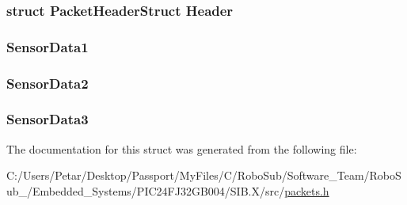\subsubsection[{Header}]{\setlength{\rightskip}{0pt plus 5cm}struct {\bf Packet\+Header\+Struct} Header}\label{struct_packet_sensor_data_get_struct_ab201af50281aff5ed4f984f994938007}
\hypertarget{struct_packet_sensor_data_get_struct_a0a8ee9f45b646be8f50ba0823043e9e2}{}
\subsubsection[{Sensor\+Data1}]{ Sensor\+Data1}\label{struct_packet_sensor_data_get_struct_a0a8ee9f45b646be8f50ba0823043e9e2}
\hypertarget{struct_packet_sensor_data_get_struct_adeec218d713b92dec76e479bf7d0a30d}{}
\subsubsection[{Sensor\+Data2}]{ Sensor\+Data2}\label{struct_packet_sensor_data_get_struct_adeec218d713b92dec76e479bf7d0a30d}
\hypertarget{struct_packet_sensor_data_get_struct_ad3730a11ddccc4b73d16714fa8415551}{}
\subsubsection[{Sensor\+Data3}]{ Sensor\+Data3}\label{struct_packet_sensor_data_get_struct_ad3730a11ddccc4b73d16714fa8415551}


The documentation for this struct was generated from the following file\+:\begin{DoxyCompactItemize}
\item 
C\+:/\+Users/\+Petar/\+Desktop/\+Passport/\+My\+Files/\+C/\+Robo\+Sub/\+Software\+\_\+\+Team/\+Robo\+Sub\+\_/\+Embedded\+\_\+\+Systems/\+P\+I\+C24\+F\+J32\+G\+B004/\+S\+I\+B.\+X/src/\hyperlink{_s_i_b_8_x_2src_2packets_8h}{packets.\+h}\end{DoxyCompactItemize}
